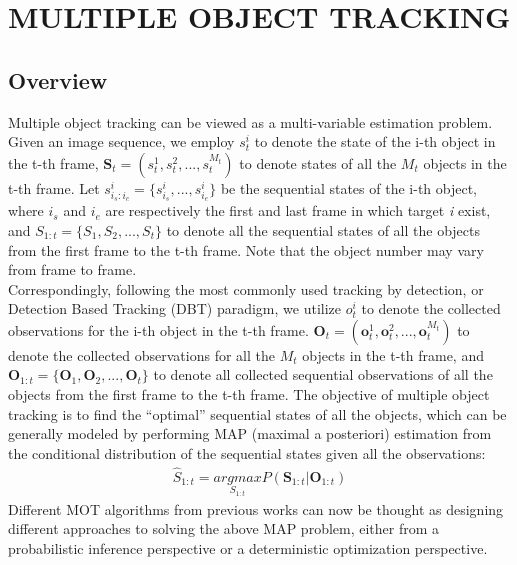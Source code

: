 \chapter{MULTIPLE OBJECT TRACKING}

\renewcommand{\headrulewidth}{0.5pt}
\renewcommand{\footrulewidth}{0.5pt}
\thispagestyle{plain}
\pagestyle{fancy}
\fancyhf{}
\raggedright
{}

\section{Overview}
    Multiple object tracking can be viewed as a multi-variable estimation problem. Given an image sequence, we employ
    $s_t^i$ to denote the state of the i-th object in the t-th frame, $\textbf{S}_t = (s_t^1, s_t^2, ..., s_t^{M_t})$
    to denote states of all the $M_t$ objects in the t-th frame. Let \textbf{$s_{i_s:i_c}^i = \{s_{i_s}^i,...,s_{i_e}^i\}$} 
    be the sequential states of the i-th object, where $i_s$ and $i_e$ are respectively the first and last frame in 
    which target \emph{i} exist, and \textbf{$S_{1:t} = \{S_1,S_2,...,S_t\}$} to denote all the sequential states of all the 
    objects from the first frame to the t-th frame. Note that the object number may vary from frame to frame. \\ 
    \vspace{3mm}
    Correspondingly, following the most commonly used tracking by detection, or Detection Based Tracking (DBT) paradigm,
    we utilize $o_t^i$ to denote the collected observations for the i-th object in the t-th frame. $\textbf{O}_t=(\textbf{o}_t^1,\textbf{o}_t^2,...,\textbf{o}_t^{M_t})$ 
    to denote the collected observations for all the $M_t$ objects in the t-th frame, and $\textbf{O}_{1:t}=\{\textbf{O}_1,\textbf{O}_2,...,\textbf{O}_t\}$ 
    to denote all collected sequential observations of all the objects from the first frame to the t-th frame.
    \vspace{3mm}
    The objective of multiple object tracking is to find the “optimal” sequential states of all the objects, which can be 
    generally modeled by performing MAP (maximal a posteriori) estimation from the conditional distribution of the 
    sequential states given all the observations: 
    \begin{align}
        \hat{S}_{1:t}=\underset{S_{1:t}}{argmax}P(\textbf{S}_{1:t}|\textbf{O}_{1:t})
    \end{align} 
    Different MOT algorithms from previous works can now be thought as designing different approaches to solving 
    the above MAP problem, either from a probabilistic inference perspective or a deterministic optimization perspective. 

